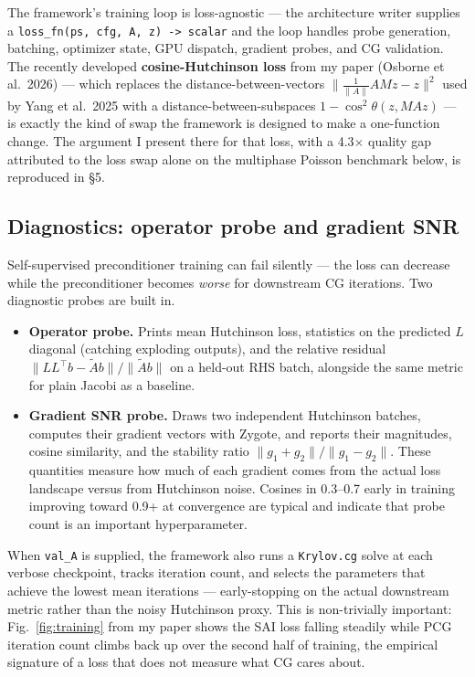 \documentclass[11pt]{article}
\newcommand{\code}[1]{\texttt{\small #1}}
\begin{document}
The framework's training loop is loss-agnostic --- the architecture writer supplies a \code{loss\_fn(ps, cfg, A, z) -> scalar} and the loop handles probe generation, batching, optimizer state, GPU dispatch, gradient probes, and CG validation. The recently developed \textbf{cosine-Hutchinson loss} from my paper (Osborne et al.\ 2026) --- which replaces the distance-between-vectors $\|\frac{1}{\|A\|} AMz - z\|^2$ used by Yang et al.\ 2025 with a distance-between-subspaces $1 - \cos^2 \theta(z, MAz)$ --- is exactly the kind of swap the framework is designed to make a one-function change. The argument I present there for that loss, with a 4.3$\times$ quality gap attributed to the loss swap alone on the multiphase Poisson benchmark below, is reproduced in \S5.

\subsection{Diagnostics: operator probe and gradient SNR}

Self-supervised preconditioner training can fail silently --- the loss can decrease while the preconditioner becomes \emph{worse} for downstream CG iterations. Two diagnostic probes are built in.

\begin{itemize}[leftmargin=*, itemsep=2pt, topsep=2pt]
\item \textbf{Operator probe.} Prints mean Hutchinson loss, statistics on the predicted $L$ diagonal (catching exploding outputs), and the relative residual $\| LL^\top b - \tilde A b\| / \| \tilde A b\|$ on a held-out RHS batch, alongside the same metric for plain Jacobi as a baseline.
\item \textbf{Gradient SNR probe.} Draws two independent Hutchinson batches, computes their gradient vectors with Zygote, and reports their magnitudes, cosine similarity, and the stability ratio $\|g_1+g_2\| / \|g_1-g_2\|$. These quantities measure how much of each gradient comes from the actual loss landscape versus from Hutchinson noise. Cosines in 0.3--0.7 early in training improving toward 0.9+ at convergence are typical and indicate that probe count is an important hyperparameter.
\end{itemize}

When \code{val\_A} is supplied, the framework also runs a \code{Krylov.cg} solve at each verbose checkpoint, tracks iteration count, and selects the parameters that achieve the lowest mean iterations --- early-stopping on the actual downstream metric rather than the noisy Hutchinson proxy. This is non-trivially important: Fig.~\ref{fig:training} from my paper shows the SAI loss falling steadily while PCG iteration count climbs back up over the second half of training, the empirical signature of a loss that does not measure what CG cares about.
\end{document}
